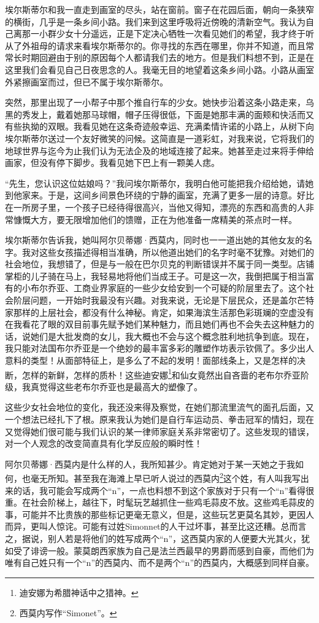 \par 埃尔斯蒂尔和我一直走到画室的尽头，站在窗前。窗子在花园后面，朝向一条狭窄的横街，几乎是一条乡间小路。我们来到这里呼吸将近傍晚的清新空气。我认为自己离那一小群少女十分遥远，正是下定决心牺牲一次看见她们的希望，我才终于听从了外祖母的请求来看埃尔斯蒂尔的。你寻找的东西在哪里，你并不知道，而且常常长时期回避由于别的原因每个人都请我们去的地方。但是我们料想不到，正是在这里我们会看见自己日夜思念的人。我毫无目的地望着这条乡间小路。小路从画室外紧擦画室而过，但已不属于埃尔斯蒂尔。
\par 突然，那里出现了一小帮子中那个推自行车的少女。她快步沿着这条小路走来，乌黑的秀发上，戴着她那马球帽，帽子压得很低，下面是她那丰满的面颊和快活而又有些执拗的双眼。我看见她在这条奇迹般幸运、充满柔情许诺的小路上，从树下向埃尔斯蒂尔送过一个友好微笑的问候。这简直是一道彩虹，对我来说，它将我们的地球世界与迄今为止我们认为无法企及的地域连接了起来。她甚至走过来将手伸给画家，但没有停下脚步。我看见她下巴上有一颗美人痣。
\par “先生，您认识这位姑娘吗？”我问埃尔斯蒂尔，我明白他可能把我介绍给她，请她到他家来。于是，这间乡间景色环绕的宁静的画室，充满了更多一层的诗意。好比在一所房子里，一个孩子已经待得很高兴，当他又得知，漂亮的东西和高贵的人非常慷慨大方，要无限增加他们的馈赠，正在为他准备一席精美的茶点时一样。
\par 埃尔斯蒂尔告诉我，她叫阿尔贝蒂娜·西莫内，同时也一一道出她的其他女友的名字。我对这些女孩描述得相当准确，所以他道出她们的名字时毫不犹豫。对她们的社会地位，我想错了，但是与一般在巴尔贝克的判断错误并不属于同一类型。店铺掌柜的儿子骑在马上，我轻易地将他们当成王子。可是这一次，我倒把属于相当富有的小布尔乔亚、工商业界家庭的一些少女给安到一个可疑的阶层里去了。这个社会阶层问题，一开始时我最没有兴趣。对我来说，无论是下层民众，还是盖尔芒特家那样的上层社会，都没有什么神秘。肯定，如果海滨生活那色彩斑斓的空虚没有在我看花了眼的双目前事先赋予她们某种魅力，而且她们再也不会失去这种魅力的话，说她们是大批发商的女儿，我大概也不会与这个概念胜利地抗争到底。现在，我只能对法国布尔乔亚是一个绝妙的最丰富多彩的雕塑作坊表示钦佩了。多少出人意料的类型！从面部特征上，是多么了不起的发明！面部线条上，又是怎样的决断，怎样的新鲜，怎样的质朴！这些迪安娜\footnote{迪安娜为希腊神话中之猎神。}和仙女竟然出自吝啬的老布尔乔亚阶级，我真觉得这些老布尔乔亚也是最高大的塑像了。
\par 这些少女社会地位的变化，我还没来得及察觉，在她们那流里流气的面孔后面，又一个想法已经扎下了根。原来我认为她们是自行车运动员、拳击冠军的情妇，现在又觉得她们很可能与我们认识的某一律师家庭关系非常密切了。这些发现的错误，对一个人观念的改变简直具有化学反应般的瞬时性！
\par 阿尔贝蒂娜·西莫内是什么样的人，我所知甚少。肯定她对于某一天她之于我如何，也毫无所知。甚至我在海滩上早已听人说过的西莫内\footnote{西莫内写作“Simonet”。}这个姓，有人叫我写出来的话，我可能会写成两个“n”，一点也料想不到这个家族对于只有一个“n”看得很重。在社会阶梯上，越往下，时髦玩艺越抓住一些鸡毛蒜皮不放。这些鸡毛蒜皮的事，可能并不比贵族的那些标记更毫无意义，但是，这些玩艺更莫名其妙，更因人而异，更叫人惊诧。可能有过姓Simonnet的人干过坏事，甚至比这还糟。总而言之，据说，别人若是将他们的姓写成两个“n”，这西莫内家的人便要大光其火，犹如受了诽谤一般。蒙莫朗西家族为自己是法兰西最早的男爵而感到自豪，而他们为唯有自己姓只有一个“n”的西莫内、而不是两个“n”的西莫内，大概感到同样自豪。
